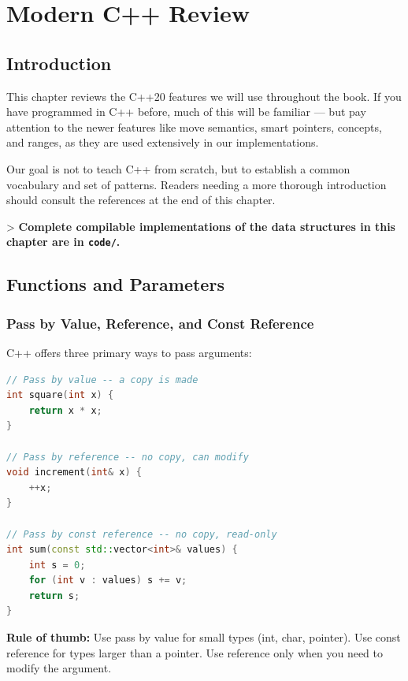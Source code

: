 \chapter{Modern C++ Review}\label{ch01:modern-c-review}

\section{Introduction}

This chapter reviews the C++20 features we will use throughout the book. If you have programmed in C++ before, much of this will be familiar — but pay attention to the newer features like move semantics, smart pointers, concepts, and ranges, as they are used extensively in our implementations.

Our goal is not to teach C++ from scratch, but to establish a common vocabulary and set of patterns. Readers needing a more thorough introduction should consult the references at the end of this chapter.

> \textbf{Complete compilable implementations of the data structures in this chapter are in \texttt{code/}.}

\section{Functions and Parameters}

\subsection{Pass by Value, Reference, and Const Reference}

C++ offers three primary ways to pass arguments:

\begin{lstlisting}[language=C++]
// Pass by value -- a copy is made
int square(int x) {
    return x * x;
}

// Pass by reference -- no copy, can modify
void increment(int& x) {
    ++x;
}

// Pass by const reference -- no copy, read-only
int sum(const std::vector<int>& values) {
    int s = 0;
    for (int v : values) s += v;
    return s;
}
\end{lstlisting}

\textbf{Rule of thumb:} Use pass by value for small types (int, char, pointer). Use const reference for types larger than a pointer. Use reference only when you need to modify the argument.


